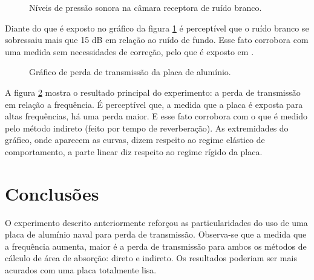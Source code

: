 \newpage
\begin{figure}[h]
\hspace{-4.5cm}
\caption{Níveis de pressão sonora na câmara receptora de ruído branco.}
\label{resultado_2}
\end{figure}

Diante do que é exposto no gráfico da figura \ref{resultado_2} é perceptível que o ruído branco se sobressaiu mais que 15 dB em relação ao ruído de fundo. Esse fato corrobora com uma medida sem necessidades de correção, pelo que é exposto em \cite{silva2009simulaccao}.

\newpage
\begin{figure}[h]
\hspace{-4.5cm}
\caption{Gráfico de perda de transmissão da placa de alumínio.}
\label{resultado_3}
\end{figure}

A figura \ref{resultado_3} mostra o resultado principal do experimento: a perda de transmissão em relação a frequência. É perceptível que, a medida que a placa é exposta para altas frequências, há uma perda maior. E esse fato corrobora com o que é medido pelo método indireto (feito por tempo de reverberação). As extremidades do gráfico, onde aparecem as curvas, dizem respeito ao regime elástico de comportamento, a parte linear diz respeito ao regime rígido da placa.


\chapter{Conclusões}\label{conclusoes}

O experimento descrito anteriormente reforçou as particularidades do uso de uma placa de alumínio naval para perda de transmissão. Observa-se que a medida que a frequência aumenta, maior é a perda de transmissão para ambos os métodos de cálculo de área de absorção: direto e indireto. Os resultados poderiam ser mais acurados com uma placa totalmente lisa.